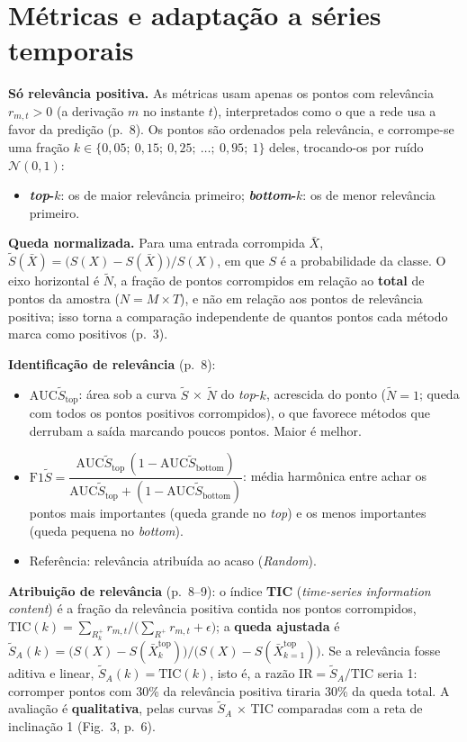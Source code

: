 \documentclass[11pt,a4paper]{article}
\begin{document}
\section{Métricas e adaptação a séries temporais}
\textbf{Só relevância positiva.} As métricas usam apenas os pontos com relevância $r_{m,t} > 0$ (a derivação $m$ no instante $t$), interpretados como o que a rede usa a favor da predição (p.~8). Os pontos são ordenados pela relevância, e corrompe-se uma fração $k \in \{0{,}05;\ 0{,}15;\ 0{,}25;\ \dots;\ 0{,}95;\ 1\}$ deles, trocando-os por ruído $\mathcal{N}(0,1)$:
\begin{itemize}
\item \textbf{\textit{top}-$k$}: os de maior relevância primeiro; \textbf{\textit{bottom}-$k$}: os de menor relevância primeiro.
\end{itemize}
\textbf{Queda normalizada.} Para uma entrada corrompida $\bar{X}$, $\tilde{S}(\bar{X}) = \big(S(X)-S(\bar{X})\big)/S(X)$, em que $S$ é a probabilidade da classe. O eixo horizontal é $\tilde{N}$, a fração de pontos corrompidos em relação ao \textbf{total} de pontos da amostra ($N = M \times T$), e não em relação aos pontos de relevância positiva; isso torna a comparação independente de quantos pontos cada método marca como positivos (p.~3).

\textbf{Identificação de relevância} (p.~8):
\begin{itemize}
\item $\mathrm{AUC}\tilde{S}_{\text{top}}$: área sob a curva $\tilde{S}$ × $\tilde{N}$ do \textit{top}-$k$, acrescida do ponto ($\tilde{N} = 1$; queda com todos os pontos positivos corrompidos), o que favorece métodos que derrubam a saída marcando poucos pontos. Maior é melhor.
\item $\mathrm{F1}\tilde{S} = \dfrac{\mathrm{AUC}\tilde{S}_{\text{top}}\,(1-\mathrm{AUC}\tilde{S}_{\text{bottom}})}{\mathrm{AUC}\tilde{S}_{\text{top}} + (1-\mathrm{AUC}\tilde{S}_{\text{bottom}})}$: média harmônica entre achar os pontos mais importantes (queda grande no \textit{top}) e os menos importantes (queda pequena no \textit{bottom}).
\item Referência: relevância atribuída ao acaso (\textit{Random}).
\end{itemize}
\textbf{Atribuição de relevância} (p.~8--9): o índice \textbf{TIC} (\textit{time-series information content}) é a fração da relevância positiva contida nos pontos corrompidos, $\mathrm{TIC}(k) = \sum_{R^+_k} r_{m,t} \big/ \big(\sum_{R^+} r_{m,t} + \epsilon\big)$; a \textbf{queda ajustada} é $\tilde{S}_A(k) = \big(S(X)-S(\bar{X}^{\text{top}}_k)\big)\big/\big(S(X)-S(\bar{X}^{\text{top}}_{k=1})\big)$. Se a relevância fosse aditiva e linear, $\tilde{S}_A(k) = \mathrm{TIC}(k)$, isto é, a razão $\mathrm{IR} = \tilde{S}_A/\mathrm{TIC}$ seria 1: corromper pontos com 30\% da relevância positiva tiraria 30\% da queda total. A avaliação é \textbf{qualitativa}, pelas curvas $\tilde{S}_A$ × TIC comparadas com a reta de inclinação 1 (Fig.~3, p.~6).
\end{document}
